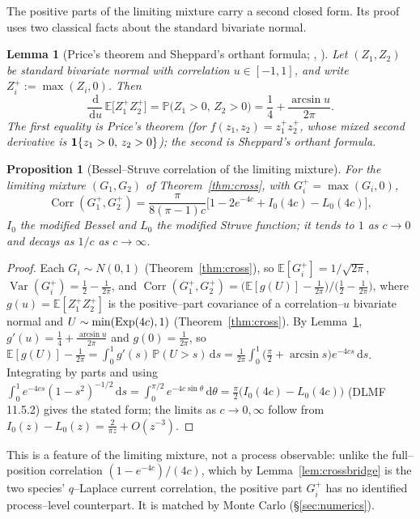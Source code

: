 \documentclass[11pt]{article}
\theoremstyle{plain}
\newtheorem{proposition}[theorem]{Proposition}
\newtheorem{lemma}[theorem]{Lemma}
\theoremstyle{definition}
\theoremstyle{remark}
\DeclareMathOperator{\Var}{Var}\DeclareMathOperator{\Cov}{Cov}
\DeclareMathOperator{\Corr}{Corr}\DeclareMathOperator{\cum}{cum}
\newcommand{\E}{\mathbb{E}}\newcommand{\PP}{\mathbb{P}}\newcommand{\dd}{\,\mathrm{d}}
\begin{document}
The positive parts of the limiting mixture carry a second closed form. Its proof
uses two classical facts about the standard bivariate normal.

\begin{lemma}[Price's theorem and Sheppard's orthant formula; {\cite{Price}}, {\cite{Sheppard}}]
\label{lem:price}
Let $(Z_1,Z_2)$ be standard bivariate normal with correlation $u\in[-1,1]$, and write
$Z_i^+:=\max(Z_i,0)$. Then
\begin{equation}\label{eq:price}
  \frac{\dd}{\dd u}\,\E\big[Z_1^+Z_2^+\big]=\PP\big(Z_1>0,\,Z_2>0\big)
  =\frac14+\frac{\arcsin u}{2\pi}.
\end{equation}
The first equality is Price's theorem (for $f(z_1,z_2)=z_1^+z_2^+$, whose mixed second
derivative is $\mathbf 1\{z_1>0,\,z_2>0\}$); the second is Sheppard's orthant formula.
\end{lemma}

\begin{proposition}[Bessel--Struve correlation of the limiting mixture]\label{prop:struve}
For the limiting mixture $(G_1,G_2)$ of Theorem~\ref{thm:cross}, with $G_i^+=\max(G_i,0)$,
\[
  \Corr(G_1^+,G_2^+)=\frac{\pi}{8(\pi-1)c}\big[1-2e^{-4c}+I_0(4c)-L_0(4c)\big],
\]
$I_0$ the modified Bessel and $L_0$ the modified Struve function; it tends to $1$ as
$c\to0$ and decays as $1/c$ as $c\to\infty$.
\end{proposition}
\begin{proof}
Each $G_i\sim N(0,1)$ (Theorem~\ref{thm:cross}), so $\E[G_i^+]=1/\sqrt{2\pi}$,
$\Var(G_i^+)=\tfrac12-\tfrac1{2\pi}$, and
$\Corr(G_1^+,G_2^+)=\big(\E[g(U)]-\tfrac1{2\pi}\big)\big/\big(\tfrac12-\tfrac1{2\pi}\big)$,
where $g(u)=\E[Z_1^+Z_2^+]$ is the positive--part covariance of a correlation--$u$
bivariate normal and $U\sim\min(\mathrm{Exp}(4c),1)$ (Theorem~\ref{thm:cross}). By
Lemma~\ref{lem:price}, $g'(u)=\tfrac14+\tfrac{\arcsin u}{2\pi}$ and $g(0)=\tfrac1{2\pi}$,
so $\E[g(U)]-\tfrac1{2\pi}=\int_0^1 g'(s)\,\PP(U>s)\dd s
=\tfrac1{2\pi}\int_0^1\big(\tfrac\pi2+\arcsin s\big)e^{-4cs}\dd s$. Integrating by parts and
using $\int_0^1 e^{-4cs}(1-s^2)^{-1/2}\dd s=\int_0^{\pi/2}e^{-4c\sin\theta}\dd\theta
=\tfrac\pi2\big(I_0(4c)-L_0(4c)\big)$ (DLMF 11.5.2) gives the stated form; the limits as
$c\to0,\infty$ follow from $I_0(z)-L_0(z)=\tfrac2{\pi z}+O(z^{-3})$.
\end{proof}

This is a feature of the limiting mixture, not a process observable: unlike the
full--position correlation $(1-e^{-4c})/(4c)$, which by Lemma~\ref{lem:crossbridge} is the
two species' $q$--Laplace current correlation, the positive part $G_i^+$ has no
identified process--level counterpart. It is matched by Monte Carlo (\S\ref{sec:numerics}).
\end{document}
